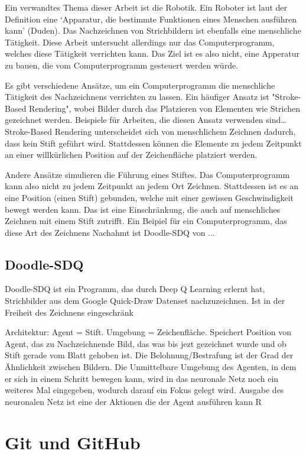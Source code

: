 Ein verwandtes Thema dieser Arbeit ist die Robotik. Ein Roboter ist laut der
Definition eine `Apparatur, die bestimmte Funktionen eines Menschen ausführen
kann' (Duden). Das Nachzeichnen von Strichbildern ist ebenfalls eine menschliche
Tätigkeit. Diese Arbeit untersucht allerdings nur das Computerprogramm, welches
diese Tätigkeit verrichten kann. Das Ziel ist es also nicht, eine Apperatur zu
bauen, die vom Computerprogramm gesteuert werden würde.

Es gibt verschiedene Ansätze, um ein Computerprogramm die menschliche Tätigkeit
des Nachzeichnens verrichten zu lassen. Ein häufiger Ansatz ist "Stroke-Based
Rendering", wobei Bilder durch das Platzieren von Elementen wie Strichen
gezeichnet werden. Beispiele für Arbeiten, die diesen Ansatz verwenden sind\dots
Stroke-Based Rendering unterscheidet sich von menschlichem Zeichnen dadurch,
dass kein Stift geführt wird. Stattdessen können die Elemente zu jedem Zeitpunkt
an einer willkürlichen Position auf der Zeichenfläche platziert werden.

Andere Ansätze simulieren die Führung eines Stiftes. Das Computerprogramm kann
also nicht zu jedem Zeitpunkt an jedem Ort Zeichnen. Stattdessen ist es an eine
Position (einen Stift) gebunden, welche mit einer gewissen Geschwindigkeit
bewegt werden kann. Das ist eine Einschränkung, die auch auf menschliches
Zeichnen mit einem Stift zutrifft. Ein Beipiel für ein Computerprogramm, das diese Art des Zeichnens Nachahmt ist
Doodle-SDQ von ...


\subsection*{Doodle-SDQ}
Doodle-SDQ ist ein Programm, das durch Deep Q Learning erlernt hat, Strichbilder
aus dem Google Quick-Draw Datenset nachzuzeichnen. Ist in der Freiheit des
Zeichnens eingeschränk\indent 

Architektur: Agent = Stift. Umgebung = Zeichenfläche. Speichert Position von
Agent, das zu Nachzeichnende Bild, das was bis jezt gezeichnet wurde und ob
Stift gerade vom Blatt gehoben ist. Die Belohnung/Bestrafung ist der Grad der
Ähnlichkeit zwischen Bildern. Die Unmittelbare Umgebung des Agenten, in dem er
sich in einem Schritt bewegen kann, wird in das neuronale Netz noch ein weiteres
Mal eingegeben, wodurch darauf ein Fokus gelegt wird. Ausgabe des neuronalen
Netz ist eine der Aktionen die der Agent ausführen kann
R

\section{Git und GitHub}
\label{chap:t_git}



